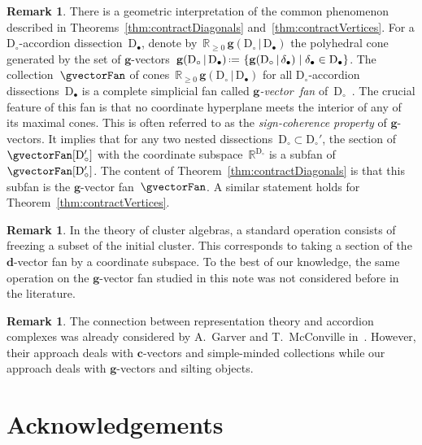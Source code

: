 \documentclass{amsart}
\theoremstyle{definition}
\newtheorem{remark}[theorem]{Remark}
\newcommand{\R}{\mathbb{R}} %
\renewcommand{\b}[1]{\mathbf{#1}} %
\newcommand{\set}[2]{\left\{ #1 \;\middle|\; #2 \right\}} %
\newcommand{\eqdef}{\mbox{\,\raisebox{0.2ex}{\scriptsize\ensuremath{\mathrm:}}\ensuremath{=}\,}} %
\newcommand{\darkblue}{\color{darkblue}} %
\newcommand{\defn}[1]{\textsl{\darkblue #1}} %
\newcommand{\dissection}{\mathrm{D}} %
\newcommand{\gvector}[2]{\mathbf{g}(#1 \,|\, #2)} %
\begin{document}
\begin{remark}
There is a geometric interpretation of the common phenomenon described in Theorems~\ref{thm:contractDiagonals} and~\ref{thm:contractVertices}.
For a $\dissection_\circ$-accordion dissection~$\dissection_\bullet$, denote by~$\R_{\ge0}\,\gvector{\dissection_\circ}{\dissection_\bullet}$ the polyhedral cone generated by the set of $\b{g}$-vectors~$\gvector{\dissection_\circ}{\dissection_\bullet} \eqdef \set{\gvector{\dissection_\circ}{\delta_\bullet}}{\delta_\bullet \in \dissection_\bullet}$. The collection~$\gvectorFan$ of cones~$\R_{\ge0}\,\gvector{\dissection_\circ}{\dissection_\bullet}$ for all $\dissection_\circ$-accordion dissections~$\dissection_\bullet$ is a complete simplicial fan called \mbox{\defn{$\b{g}$-vector fan}} of~$\dissection_\circ$~\cite{MannevillePilaud-accordion}.
The crucial feature of this fan is that no coordinate hyperplane meets the interior of any of its maximal cones.
This is often referred to as the \defn{sign-coherence property} of $\b{g}$-vectors.
It implies that for any two nested dissections~$\dissection_\circ \subset \dissection_\circ'$, the section of~$\gvectorFan[\dissection_\circ']$ with the coordinate subspace~$\R^{\dissection_\circ}$ is a subfan of~$\gvectorFan[\dissection_\circ']$.
The content of Theorem~\ref{thm:contractDiagonals} is that this subfan is the $\b{g}$-vector fan~$\gvectorFan$.
A similar statement holds for Theorem~\ref{thm:contractVertices}.
\end{remark}

\begin{remark}
In the theory of cluster algebras, a standard operation consists of freezing a subset of the initial cluster.
This corresponds to taking a section of the $\b{d}$-vector fan by a coordinate subspace.
To the best of our knowledge, the same operation on the $\b{g}$-vector fan studied in this note was not considered before in the literature.
\end{remark}

\begin{remark}
The connection between representation theory and accordion complexes was already considered by A.~Garver and T.~McConville in~\cite[Sect.~8]{GarverMcConville}.
However, their approach deals with $\b{c}$-vectors and simple-minded collections while our approach deals with $\b{g}$-vectors and silting objects.
\end{remark}



\section*{Acknowledgements}
\end{document}
